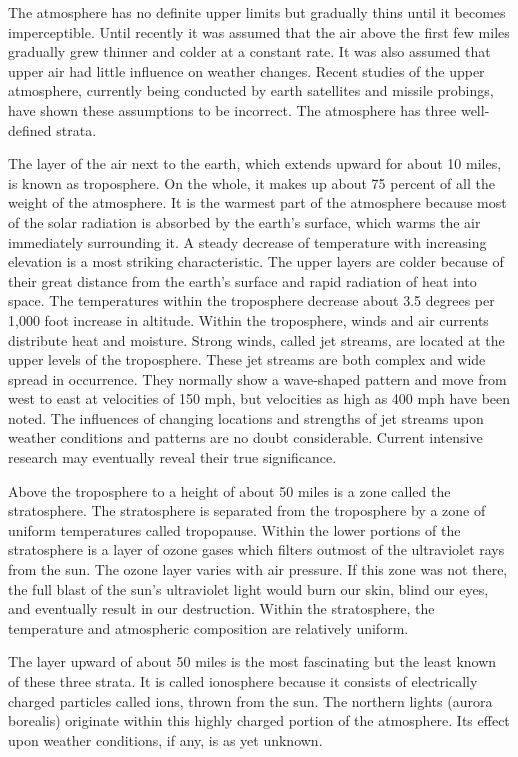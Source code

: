 The atmosphere has no definite upper limits but gradually thins until it becomes imperceptible. Until recently it was assumed that the air above the first few miles gradually grew thinner and colder at a constant rate. It was also assumed that upper air had little influence on weather changes. Recent studies of the upper atmosphere, currently being conducted by earth satellites and missile probings, have shown these assumptions to be incorrect. The atmosphere has three well-defined strata.

The layer of the air next to the earth, which extends upward for about 10 miles, is known as troposphere. On the whole, it makes up about 75 percent of all the weight of the atmosphere. It is the warmest part of the atmosphere because most of the solar radiation is absorbed by the earth's surface, which warms the air immediately surrounding it. A steady decrease of temperature with increasing elevation is a most striking characteristic. The upper layers are colder because of their great distance from the earth's surface and rapid radiation of heat into space. The temperatures within the troposphere decrease about 3.5 degrees per 1,000 foot increase in altitude. Within the troposphere, winds and air currents distribute heat and moisture. Strong winds, called jet streams, are located at the upper levels of the troposphere. These jet streams are both complex and wide spread in occurrence. They normally show a wave-shaped pattern and move from west to east at velocities of 150 mph, but velocities as high as 400 mph have been noted. The influences of changing locations and strengths of jet streams upon weather conditions and patterns are no doubt considerable. Current intensive research may eventually reveal their true significance.

Above the troposphere to a height of about 50 miles is a zone called the stratosphere. The stratosphere is separated from the troposphere by a zone of uniform temperatures called tropopause. Within the lower portions of the stratosphere is a layer of ozone gases which filters outmost of the ultraviolet rays from the sun. The ozone layer varies with air pressure. If this zone was not there, the full blast of the sun's ultraviolet light would burn our skin, blind our eyes, and eventually result in our destruction. Within the stratosphere, the temperature and atmospheric composition are relatively uniform.

The layer upward of about 50 miles is the most fascinating but the least known of these three strata. It is called ionosphere because it consists of electrically charged particles called ions, thrown from the sun. The northern lights (aurora borealis) originate within this highly charged portion of the atmosphere. Its effect upon weather conditions, if any, is as yet unknown.

